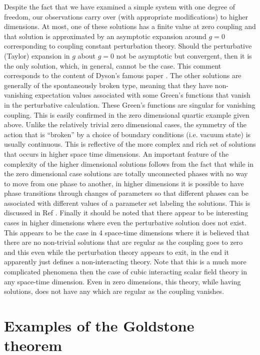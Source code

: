 \documentclass[12pt]{article}
\begin{document}
    Despite the fact that we have examined a simple system with one degree of
    freedom, our observations carry over (with appropriate modifications) to
    higher dimensions. At most, one of these solutions has a finite value at
    zero coupling and that solution is approximated by an asymptotic expansion
    around $g=0$ corresponding to coupling constant perturbation
    theory. Should the perturbative (Taylor) expansion in $g$ about $g=0$ not
    be asymptotic but convergent, then it is the only solution, which, in
    general, cannot be the case. This comment corresponds to the content of
    Dyson's famous paper \cite{dyson;1952}. The other solutions are generally
    of the spontaneously broken type, meaning that they have non-vanishing
    expectation values associated with some Green's functions that vanish in
    the perturbative calculation. These Green's functions are singular for
    vanishing coupling. This is easily confirmed in the zero dimensional
    quartic example given above. Unlike the relatively trivial zero
    dimensional cases, the symmetry of the action that is ``broken'' by a
    choice of boundary conditions (i.e. vacuum state) is usually
    continuous. This is reflective of the more complex and rich set of
    solutions that occurs in higher space time dimensions. An important
    feature of the complexity of the higher dimensional solutions follows from
    the fact that while in the zero dimensional case solutions are totally
    unconnected phases with no way to move from one phase to another, in
    higher dimensions it is possible to have phase transitions through changes
    of parameters so that different phases can be associated with different
    values of a parameter set labeling the solutions. This is discussed in Ref
    \cite{ggzg;2007}. Finally it should be noted that there appear to be
    interesting cases in higher dimensions where even the perturbative
    solution does not exist. This appears to be the case in 4 space-time
    dimensions where it is believed that there are no non-trivial solutions
    that are regular as the coupling goes to zero and this even while the
    perturbation theory appears to exit, in the end it apparently just defines
    a non-interacting theory. Note that this is a much more complicated
    phenomena then the case of cubic interacting scalar field theory in any
    space-time dimension. Even in zero dimensions, this theory, while having
    solutions, does not have any which are regular as the coupling vanishes.

\section{Examples of the Goldstone theorem } \label{sec:3}
\end{document}
